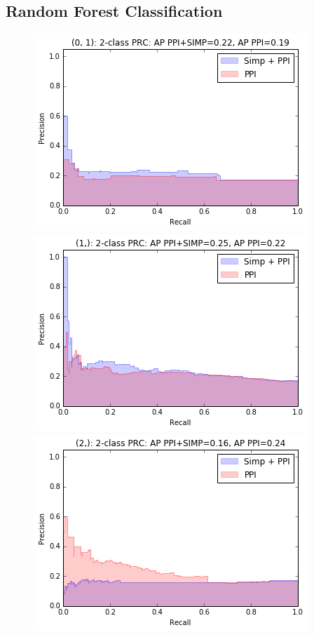 \documentclass[9pt]{article}
\begin{document}
{\subsection{Random Forest Classification}
\begin{figure}[!htb]
  \includegraphics[width=\linewidth]{logisticRegressionGraphs/for1.png}
\endminipage\hfill
{}
  \includegraphics[width=\linewidth]{logisticRegressionGraphs/for2.png}
\endminipage\hfill
{}%
  \includegraphics[width=\linewidth]{logisticRegressionGraphs/for3.png}
\endminipage
\end{figure}

}
\end{document}

